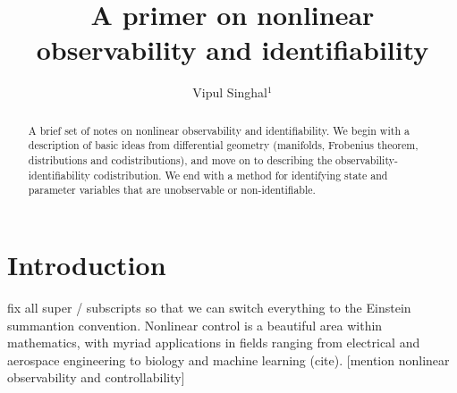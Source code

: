 \documentclass[psamsfonts]{amsart}
\title{A primer on nonlinear observability and identifiability} %
\author{Vipul Singhal$^{1}$}
\theoremstyle{definition}
\theoremstyle{remark}
\numberwithin{equation}{section}
\begin{document}
\begin{abstract}

A brief set of notes on nonlinear observability and identifiability. We begin with a description of basic ideas from differential geometry (manifolds, Frobenius theorem, distributions and codistributions), and move on to describing the observability-identifiability codistribution. We end with a method for identifying state and parameter variables that are unobservable or non-identifiable. %


\end{abstract}

\maketitle
\tableofcontents

\section{Introduction} 

{\color{red}fix all super / subscripts so that we can switch everything to the Einstein summantion convention.}
Nonlinear control is a beautiful area within mathematics, with myriad applications in fields ranging from electrical and aerospace engineering to biology and machine learning (cite). [mention nonlinear observability and controllability]
\end{document}
